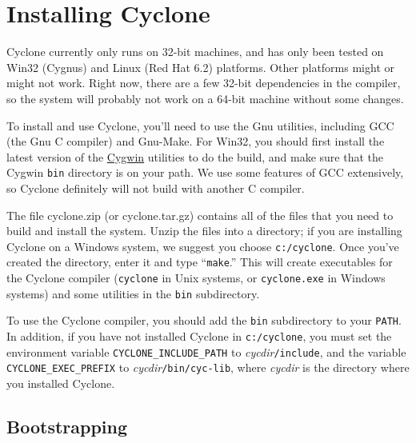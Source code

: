 \section{Installing Cyclone}
\label{sec:install}
Cyclone currently only runs on 32-bit machines, and has only been
tested on Win32 (Cygnus) and Linux (Red Hat 6.2) platforms.  Other
platforms might or might not work.  Right now, there are a few 32-bit
dependencies in the compiler, so the system will probably not work on
a 64-bit machine without some changes.

To install and use Cyclone, you'll need to use the Gnu utilities,
including GCC (the Gnu C compiler) and Gnu-Make.  For Win32, you
should first install the latest version of the
\href{http://cygwin.com/}{Cygwin} utilities to do the build, and make
sure that the Cygwin \texttt{bin} directory is on your path. We use
some features of GCC extensively, so Cyclone definitely will not build
with another C compiler.

The file cyclone.zip (or cyclone.tar.gz) contains all of the files
that you need to build and install the system.  Unzip the files into a
directory; if you are installing Cyclone on a Windows system, we
suggest you choose \texttt{c:/cyclone}.  Once you've created the
directory, enter it and type ``\texttt{make}.''  This will create
executables for the Cyclone compiler (\texttt{cyclone} in Unix
systems, or \texttt{cyclone.exe} in Windows systems) and some
utilities in the \texttt{bin} subdirectory.

To use the Cyclone compiler, you should add the \texttt{bin}
subdirectory to your \texttt{PATH}.  In addition, if you have not
installed Cyclone in \texttt{c:/cyclone}, you must set the environment
variable \texttt{CYCLONE_INCLUDE_PATH} to
\textit{cycdir}\texttt{/include}, and the variable
\texttt{CYCLONE_EXEC_PREFIX} to \textit{cycdir}\texttt{/bin/cyc-lib},
where \textit{cycdir} is the directory where you installed Cyclone.

\subsection*{Bootstrapping}

